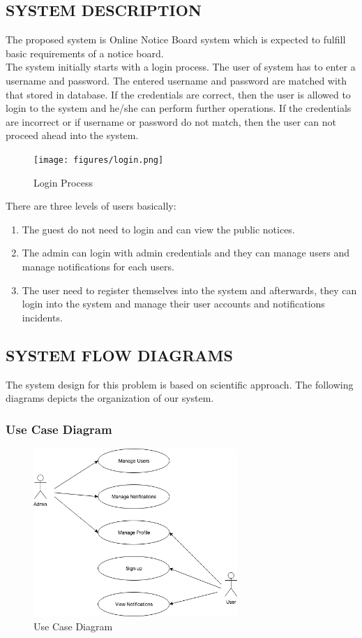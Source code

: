 \documentclass[12pt,a4paper]{article}
\begin{document}
    \subsection{SYSTEM DESCRIPTION}
    The proposed system is Online Notice Board system which is expected to fulfill basic requirements of a notice board.\\
    The system initially starts with a login process. The user of system has to enter a username and password. The entered username and password are matched with that stored in database. If the credentials are correct, then the user is allowed to login to the system and he/she can perform further operations. If the credentials are incorrect or if username or password do not match, then the user can not proceed ahead into the system.
	\begin{figure}[H]
		\centering
		\texttt{[image: figures/login.png]}
		\caption{Login Process}
	\end{figure}
	\noindent There are three levels of users basically:
	\begin{enumerate}
	    \item The guest do not need to login and can view the public notices.
	    \item The admin can login with admin credentials and they can manage users and manage notifications for each users.
	    \item The user need to register themselves into the system and afterwards, they can login into the system and manage their user accounts and notifications incidents.
	\end{enumerate}
	
    \cleardoublepage{}
	\subsection{SYSTEM FLOW DIAGRAMS}
	The system design for this problem is based on scientific approach. The following diagrams depicts the organization of our system.
	
	    \subsubsection{Use Case Diagram}
	    \begin{figure}[H]
    		\centering
    		\includegraphics[height=2.5in]{figures/use_case_diagram.png}
    		\caption{Use Case Diagram}
    	\end{figure}
    	
\end{document}
